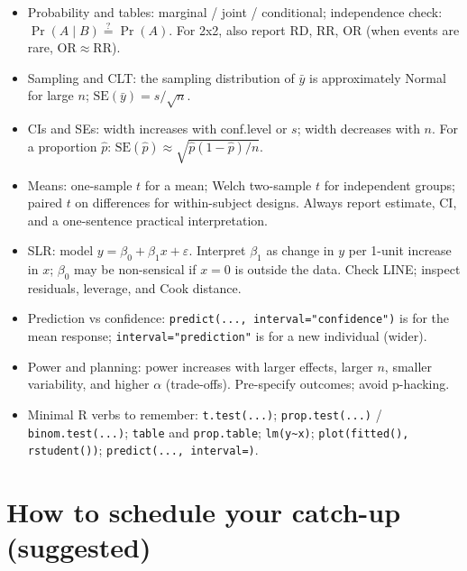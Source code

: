 \documentclass[11pt,a4paper]{article}
\def\textbf#1{#1}%
\begin{document}
\begin{tcolorbox}[colback=SoftBg,colframe=Accent!40!black,breakable,boxrule=0.5pt,arc=2mm]
\begin{itemize}
  \item \textbf{Probability and tables:} marginal / joint / conditional; independence check: \( \Pr(A\mid B) \stackrel{?}{=} \Pr(A) \). For 2x2, also report \textbf{RD}, \textbf{RR}, \textbf{OR} (when events are rare, \(\mathrm{OR} \approx \mathrm{RR}\)).
  \item \textbf{Sampling and CLT:} the sampling distribution of \(\bar y\) is approximately Normal for large \(n\); \(\mathrm{SE}(\bar y) = s/\sqrt{n}\).
  \item \textbf{CIs and SEs:} width increases with conf.level or \(s\); width decreases with \(n\). For a proportion \(\hat p\): \(\mathrm{SE}(\hat p) \approx \sqrt{\hat p(1-\hat p)/n}\).
  \item \textbf{Means:} one-sample \(t\) for a mean; \textbf{Welch two-sample \(t\)} for independent groups; \textbf{paired \(t\)} on differences for within-subject designs. Always report estimate, CI, and a one-sentence practical interpretation.
  \item \textbf{SLR:} model \(y = \beta_0 + \beta_1 x + \varepsilon\). Interpret \(\beta_1\) as change in \(y\) per 1-unit increase in \(x\); \(\beta_0\) may be non-sensical if \(x=0\) is outside the data. Check \textbf{LINE}; inspect residuals, leverage, and Cook distance.
  \item \textbf{Prediction vs confidence:} \verb|predict(..., interval="confidence")| is for the mean response; \verb|interval="prediction"| is for a new individual (wider).
  \item \textbf{Power and planning:} power increases with larger effects, larger \(n\), smaller variability, and higher \(\alpha\) (trade-offs). Pre-specify outcomes; avoid p-hacking.
  \item \textbf{Minimal R verbs to remember:} \verb|t.test(...)|; \verb|prop.test(...)| / \verb|binom.test(...)|; \verb|table| and \verb|prop.table|; \verb|lm(y~x)|; \verb|plot(fitted(), rstudent())|; \verb|predict(..., interval=)|.
\end{itemize}
\end{tcolorbox}

\section*{How to schedule your catch-up (suggested)}
\end{document}
